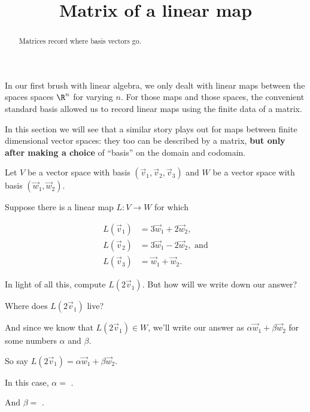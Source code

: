 \documentclass{ximera}
\title{Matrix of a linear map}
\begin{document}
\begin{abstract}
  Matrices record where basis vectors go.
\end{abstract}

In our first brush with linear algebra, we only dealt with linear maps
between the spaces spaces $\R^n$ for varying $n$.  For those maps and
those spaces, the convenient standard basis allowed us to record
linear maps using the finite data of a matrix.

In this section we will see that a similar story plays out for maps
between finite dimensional vector spaces: they too can be described by
a matrix, \textbf{but only after making a choice} of ``basis'' on the
domain and codomain.

\begin{question}
  Let $V$ be a vector space with basis $(\vec{v}_1,\vec{v}_2,\vec{v}_3)$ and $W$ be a vector space with basis $(\vec{w}_1,\vec{w}_2)$.

  Suppose there is a linear map $L: V \to W$ for which
  
  \begin{align*}
    L(\vec{v}_1) &= 3\vec{w}_1 + 2\vec{w}_2, \\ 
    L(\vec{v}_2) &= 3\vec{w}_1 - 2\vec{w}_2, \text{ and} \\
    L(\vec{v}_3) &= \vec{w}_1 + \vec{w}_2.
  \end{align*}
  
  In light of all this, compute $L(2\vec{v}_1)$.  But how will we write down our answer?

  Where does $L(2\vec{v}_1)$ live?

  \begin{solution}
    \begin{multiple-choice}
    \end{multiple-choice}
  \end{solution}

    And since we know that $L(2\vec{v}_1) \in W$, we'll write our
    answer as $\alpha \vec{w}_1 + \beta \vec{w}_2$ for some numbers
    $\alpha$ and $\beta$.

    So say $L(2\vec{v}_1) = \alpha \vec{w}_1 + \beta \vec{w}_2$.  

    \begin{solution}
      In this case, $\alpha = $ .
    \end{solution}

    \begin{solution}
      And $\beta = $ .
    \end{solution}


\end{question}
\end{document}

